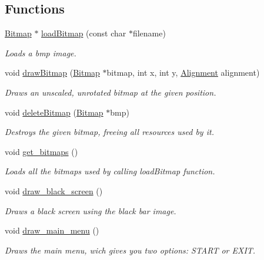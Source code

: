 \subsection*{Functions}
\begin{DoxyCompactItemize}
\item 
\hyperlink{struct_bitmap}{Bitmap} $\ast$ \hyperlink{group___bitmap_ga3506880ffd407c36eb8aaddd2c1606d2}{load\+Bitmap} (const char $\ast$filename)
\begin{DoxyCompactList}\small\item\em Loads a bmp image. \end{DoxyCompactList}\item 
void \hyperlink{group___bitmap_ga18d05a1c671f4638bc63d37874efb9d4}{draw\+Bitmap} (\hyperlink{struct_bitmap}{Bitmap} $\ast$bitmap, int x, int y, \hyperlink{group___bitmap_gacdfaca60ec19c0265bac2692d7982726}{Alignment} alignment)
\begin{DoxyCompactList}\small\item\em Draws an unscaled, unrotated bitmap at the given position. \end{DoxyCompactList}\item 
void \hyperlink{group___bitmap_ga08c1d4f4fff81df260d979ea8fc1aa61}{delete\+Bitmap} (\hyperlink{struct_bitmap}{Bitmap} $\ast$bmp)
\begin{DoxyCompactList}\small\item\em Destroys the given bitmap, freeing all resources used by it. \end{DoxyCompactList}\item 
void \hyperlink{group___bitmap_gabda6654c65348aa9c06a9ae0e9562b9a}{get\+\_\+bitmaps} ()
\begin{DoxyCompactList}\small\item\em Loads all the bitmaps used by calling load\+Bitmap function. \end{DoxyCompactList}\item 
void \hyperlink{group___bitmap_ga66c6cdf9473527bd3dcbab53d147d5b9}{draw\+\_\+black\+\_\+screen} ()
\begin{DoxyCompactList}\small\item\em Draws a black screen using the black bar image. \end{DoxyCompactList}\item 
void \hyperlink{group___bitmap_ga83361e027b6f0dd917305f1f82dedda3}{draw\+\_\+main\+\_\+menu} ()
\begin{DoxyCompactList}\small\item\em Draws the main menu, wich gives you two options\+: S\+T\+A\+RT or E\+X\+IT. \end{DoxyCompactList}\item 

\end{DoxyCompactItemize}
